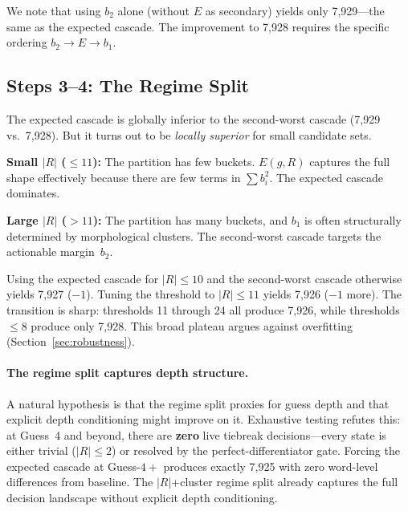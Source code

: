 \documentclass[11pt]{article}
\begin{document}
	We note that using $b_2$ alone (without $E$ as secondary) yields only 7,929---the same as the expected cascade.  The improvement to 7,928 requires the specific ordering $b_2 \to E \to b_1$.
	
	\subsection{Steps 3--4: The Regime Split}
	
	The expected cascade is globally inferior to the second-worst cascade (7,929 vs.\ 7,928).  But it turns out to be \emph{locally superior} for small candidate sets.
	
	\textbf{Small $|R|$ ($\leq 11$):} The partition has few buckets.  $E(g,R)$ captures the full shape effectively because there are few terms in $\sum b_i^2$.  The expected cascade dominates.
	
	\textbf{Large $|R|$ ($> 11$):} The partition has many buckets, and $b_1$ is often structurally determined by morphological clusters.  The second-worst cascade targets the actionable margin~$b_2$.
	
	Using the expected cascade for $|R| \leq 10$ and the second-worst cascade otherwise yields 7,927 ($-1$).  Tuning the threshold to $|R| \leq 11$ yields 7,926 ($-1$ more).  The transition is sharp: thresholds 11 through 24 all produce 7,926, while thresholds $\leq 8$ produce only 7,928.  This broad plateau argues against overfitting (Section~\ref{sec:robustness}).
	
	\paragraph{The regime split captures depth structure.}
	A natural hypothesis is that the regime split proxies for guess depth and that explicit depth conditioning might improve on it.  Exhaustive testing refutes this: at Guess~4 and beyond, there are \textbf{zero} live tiebreak decisions---every state is either trivial ($|R| \leq 2$) or resolved by the perfect-differentiator gate.  Forcing the expected cascade at Guess-$4{+}$ produces exactly 7,925 with zero word-level differences from baseline.  The $|R|$+cluster regime split already captures the full decision landscape without explicit depth conditioning.
	
\end{document}
